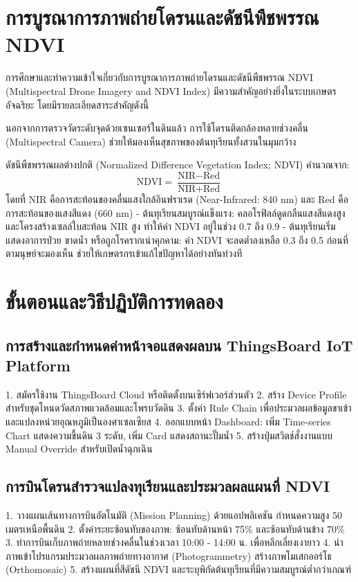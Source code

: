 \section{การบูรณาการภาพถ่ายโดรนและดัชนีพืชพรรณ NDVI}

การศึกษาและทำความเข้าใจเกี่ยวกับการบูรณาการภาพถ่ายโดรนและดัชนีพืชพรรณ NDVI (Multispectral Drone Imagery and NDVI Index) มีความสำคัญอย่างยิ่งในระบบเกษตรอัจฉริยะ โดยมีรายละเอียดสาระสำคัญดังนี้

นอกจากการตรวจวัดระดับจุดด้วยเซนเซอร์ในดินแล้ว การใช้โดรนติดกล้องหลายช่วงคลื่น (Multispectral Camera) ช่วยให้มองเห็นสุขภาพของต้นทุเรียนทั้งสวนในมุมกว้าง

ดัชนีพืชพรรณผลต่างปกติ (Normalized Difference Vegetation Index; NDVI) คำนวณจาก:
\[ \text{NDVI} = \frac{\text{NIR} - \text{Red}}{\text{NIR} + \text{Red}} \]
โดยที่ NIR คือการสะท้อนของคลื่นแสงใกล้อินฟราเรด (Near-Infrared: 840 nm) และ Red คือการสะท้อนของแสงสีแดง (660 nm)
- ต้นทุเรียนสมบูรณ์แข็งแรง: คลอโรฟิลล์ดูดกลืนแสงสีแดงสูง และโครงสร้างเซลล์ใบสะท้อน NIR สูง ทำให้ค่า NDVI อยู่ในช่วง 0.7 ถึง 0.9
- ต้นทุเรียนเริ่มแสดงอาการป่วย ขาดน้ำ หรือถูกโรครากเน่าคุกคาม: ค่า NDVI จะลดต่ำลงเหลือ 0.3 ถึง 0.5 ก่อนที่ตามนุษย์จะมองเห็น ช่วยให้เกษตรกรเข้าแก้ไขปัญหาได้อย่างทันท่วงที

\section{ขั้นตอนและวิธีปฏิบัติการทดลอง}

\subsection{การสร้างและกำหนดค่าหน้าจอแสดงผลบน ThingsBoard IoT Platform}
\begin{sensorbox}
1. สมัครใช้งาน ThingsBoard Cloud หรือติดตั้งบนเซิร์ฟเวอร์ส่วนตัว
2. สร้าง Device Profile สำหรับชุดโหนดวัดสภาพแวดล้อมและโพรบวัดดิน
3. ตั้งค่า Rule Chain เพื่อประมวลผลข้อมูลขาเข้าและแปลงหน่วยอุณหภูมิเป็นองศาเซลเซียส
4. ออกแบบหน้า Dashboard: เพิ่ม Time-series Chart แสดงความชื้นดิน 3 ระดับ, เพิ่ม Card แสดงสถานะปั๊มน้ำ
5. สร้างปุ่มสวิตช์สั่งงานแบบ Manual Override สำหรับเปิดน้ำฉุกเฉิน
\end{sensorbox}

\subsection{การบินโดรนสำรวจแปลงทุเรียนและประมวลผลแผนที่ NDVI}
\begin{sensorbox}
1. วางแผนเส้นทางการบินอัตโนมัติ (Mission Planning) ด้วยแอปพลิเคชัน กำหนดความสูง 50 เมตรเหนือพื้นดิน
2. ตั้งค่าระยะซ้อนทับของภาพ: ซ้อนทับด้านหน้า 75\% และซ้อนทับด้านข้าง 70\%
3. ทำการบินเก็บภาพถ่ายหลายช่วงคลื่นในช่วงเวลา 10:00 - 14:00 น. เพื่อหลีกเลี่ยงเงายาว
4. นำภาพเข้าโปรแกรมประมวลผลภาพถ่ายทางอากาศ (Photogrammetry) สร้างภาพโมเสกออร์โธ (Orthomosaic)
5. สร้างแผนที่สีดัชนี NDVI และระบุพิกัดต้นทุเรียนที่มีความสมบูรณ์ต่ำกว่าเกณฑ์
\end{sensorbox}


